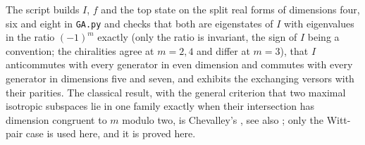 The script builds $I$, $f$ and the top state on the split real forms of dimensions four, six and eight in \texttt{GA.py} and checks that both are eigenstates of $I$ with eigenvalues in the ratio $(-1)^{m}$ exactly (only the ratio is invariant, the sign of $I$ being a convention; the chiralities agree at $m = 2, 4$ and differ at $m = 3$), that $I$ anticommutes with every generator in even dimension and commutes with every generator in dimensions five and seven, and exhibits the exchanging versors with their parities. The classical result, with the general criterion that two maximal isotropic subspaces lie in one family exactly when their intersection has dimension congruent to $m$ modulo two, is Chevalley's \cite[Ch.~III, \S1]{Chevalley1954}, see also \cite{LawsonMichelsohn1989}; only the Witt-pair case is used here, and it is proved here.
